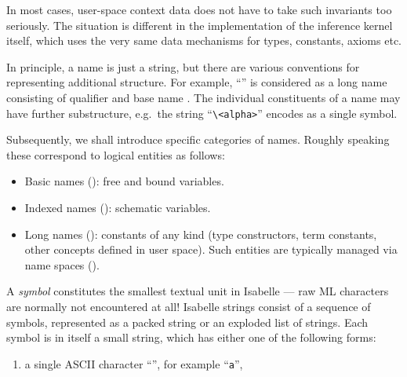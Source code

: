 \begin{isabellebody}
\begin{isamarkuptext}
  In most cases, user-space context data does not have to take such
  invariants too seriously.  The situation is different in the
  implementation of the inference kernel itself, which uses the very
  same data mechanisms for types, constants, axioms etc.%
\end{isamarkuptext}%
\isamarkuptrue%
%
\isamarkuptrue%
%
\begin{isamarkuptext}%
In principle, a name is just a string, but there are various
  conventions for representing additional structure.  For example,
  ``'' is considered as a long name consisting of
  qualifier  and base name .  The
  individual constituents of a name may have further substructure,
  e.g.\ the string ``\verb,\,\verb,<alpha>,'' encodes as a single
  symbol.

  \medskip Subsequently, we shall introduce specific categories of
  names.  Roughly speaking these correspond to logical entities as
  follows:
  \begin{itemize}

  \item Basic names (): free and bound
  variables.

  \item Indexed names (): schematic variables.

  \item Long names (): constants of any kind
  (type constructors, term constants, other concepts defined in user
  space).  Such entities are typically managed via name spaces
  ().

  \end{itemize}%
\end{isamarkuptext}%
\isamarkuptrue%
%
\isamarkuptrue%
%
\begin{isamarkuptext}%
A \emph{symbol} constitutes the smallest textual unit in
  Isabelle --- raw ML characters are normally not encountered at all!
  Isabelle strings consist of a sequence of symbols, represented as a
  packed string or an exploded list of strings.  Each symbol is in
  itself a small string, which has either one of the following forms:

  \begin{enumerate}

  \item a single ASCII character ``'', for example
  ``\verb,a,'',


\end{enumerate}
\end{isamarkuptext}
\end{isabellebody}
